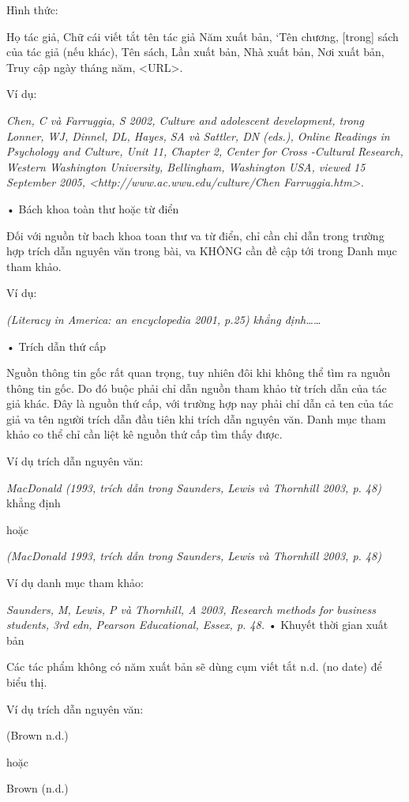 \documentclass{hcmutarticle}
\begin{document}
Hình thức:

Họ tác giả, Chữ cái viết tắt tên tác giả Năm xuất bản, ‘Tên chương, [trong] sách của tác giả (nếu khác), Tên sách, Lần xuất bản, Nhà xuất bản, Nơi xuất bản, Truy cập ngày tháng năm, <URL>.

Ví dụ:

{\em Chen, C và Farruggia, S 2002, Culture and adolescent development, trong Lonner, WJ, Dinnel, DL, Hayes, SA và Sattler, DN (eds.), Online Readings in Psychology and Culture, Unit 11, Chapter 2, Center for Cross -Cultural Research, Western Washington University, Bellingham, Washington USA, viewed 15 September 2005, <http://www.ac.wwu.edu/culture/Chen Farruggia.htm>.}

•	Bách khoa toàn thư hoặc từ điển

Đối với nguồn từ bach khoa toan thư va từ điển, chỉ cần chỉ dẫn trong trường hợp trích dẫn nguyên văn trong bài, va KHÔNG cần đề cập tới trong Danh mục tham khảo.

Ví dụ:

{\em (Literacy in America: an encyclopedia 2001, p.25) khẳng định……}

•	Trích dẫn thứ cấp

Nguồn thông tin gốc rất quan trọng, tuy nhiên đôi khi không thể tìm ra nguồn thông tin gốc. Do đó buộc phải chỉ dẫn nguồn tham khảo từ trích dẫn của tác giả khác. Đây là nguồn thứ cấp, với trường hợp nay phải chỉ dẫn cả ten của tác giả va tên người trích dẫn đầu tiên khi trích dẫn nguyên văn. Danh mục tham khảo co thể chỉ cần liệt kê nguồn thứ cấp tìm thấy được.

Ví dụ trích dẫn nguyên văn:


{\em MacDonald (1993, trích dẫn trong Saunders, Lewis và Thornhill 2003, p. 48)} khẳng định

hoặc

{\em (MacDonald 1993, trích dẫn trong Saunders, Lewis  và Thornhill 2003, p. 48)}

Ví dụ danh mục tham khảo:

{\em Saunders, M, Lewis, P và Thornhill, A 2003, Research methods for business
students, 3rd edn, Pearson Educational, Essex, p. 48.}
•	Khuyết thời gian xuất bản

Các tác phẩm không có năm xuất bản sẽ dùng cụm viết tắt n.d. (no date) để biểu thị.

Ví dụ trích dẫn nguyên văn:

(Brown n.d.)

hoặc

Brown (n.d.)
\end{document}
